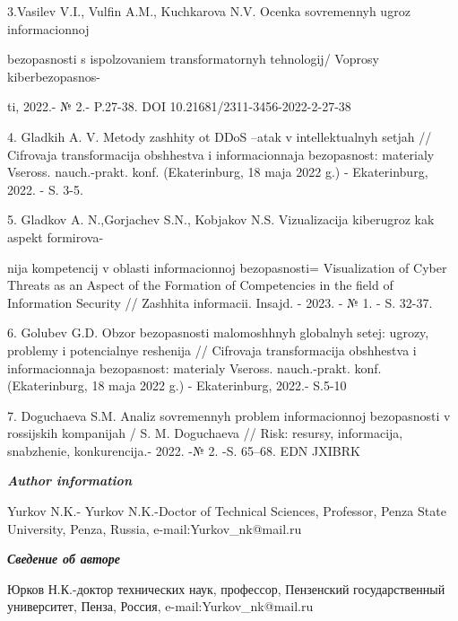 3.Vasil\textquotesingle ev V.I., Vul\textquotesingle fin A.M.,
Kuchkarova N.V. Ocenka sovremennyh ugroz informacionnoj

bezopasnosti s ispol\textquotesingle zovaniem transformatornyh
tehnologij/ Voprosy kiberbezopasnos-

ti, 2022.- № 2.- P.27-38. DOI 10.21681/2311-3456-2022-2-27-38

4. Gladkih A. V. Metody zashhity ot DDoS --atak v
intellektual\textquotesingle nyh setjah // Cifrovaja transformacija
obshhestva i informacionnaja bezopasnost\textquotesingle: materialy
Vseross. nauch.-prakt. konf. (Ekaterinburg, 18 maja 2022 g.) -
Ekaterinburg, 2022. - S. 3-5.

5. Gladkov A. N.,Gorjachev S.N., Kobjakov N.S. Vizualizacija kiberugroz
kak aspekt formirova-

nija kompetencij v oblasti informacionnoj bezopasnosti= Visualization of
Cyber Threats as an Aspect of the Formation of Competencies in the field
of Information Security // Zashhita informacii. Insajd. - 2023. - № 1. -
S. 32-37.

6. Golubev G.D. Obzor bezopasnosti malomoshhnyh
global\textquotesingle nyh setej: ugrozy, problemy i
potencial\textquotesingle nye reshenija // Cifrovaja transformacija
obshhestva i informacionnaja bezopasnost\textquotesingle: materialy
Vseross. nauch.-prakt. konf. (Ekaterinburg, 18 maja 2022 g.) -
Ekaterinburg, 2022.- S.5-10

7. Doguchaeva S.M. Analiz sovremennyh problem informacionnoj
bezopasnosti v rossijskih kompanijah / S. M. Doguchaeva // Risk:
resursy, informacija, snabzhenie, konkurencija.- 2022. -№ 2. -S. 65--68.
EDN JXIBRK~

\emph{{\bfseries Author information}}

Yurkov N.K.- Yurkov N.K.-Doctor of Technical Sciences, Professor, Penza
State University, Penza, Russia, e-mail:Yurkov\_nk@mail.ru

\emph{{\bfseries Сведение об авторе}}

Юрков Н.К.-доктор технических наук, профессор, Пензенский
государственный университет, Пенза, Россия, e-mail:Yurkov\_nk@mail.ru
